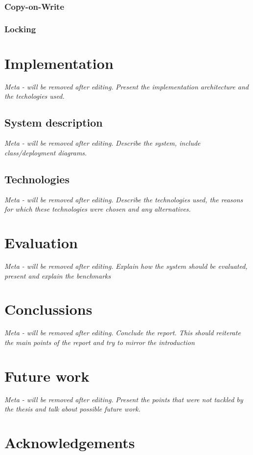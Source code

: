 \documentclass[11pt,a4paper]{globis-book}
\begin{document}
\subsection{Copy-on-Write}
\subsection{Locking}

\chapter{Implementation}
\textit{Meta - will be removed after editing.}
\textit{Present the implementation architecture and the techologies used.}
\section{System description}
\textit{Meta - will be removed after editing.}
\textit{Describe the system, include class/deployment diagrams.}
\section{Technologies}
\textit{Meta - will be removed after editing.}
\textit{Describe the technologies used, the reasons for which these technologies were chosen and any alternatives.}

\chapter{Evaluation}
\textit{Meta - will be removed after editing.}
\textit{Explain how the system should be evaluated, present and explain the benchmarks}
\chapter{Conclussions}

\textit{Meta - will be removed after editing.}
\textit{Conclude the report. This should reiterate the main points of the report and try to mirror the introduction}
\chapter{Future work}

\textit{Meta - will be removed after editing.}
\textit{Present the points that were not tackled by the thesis and talk about possible future work.}

\appendix

\listoffigures
\listoftables

\chapter*{Acknowledgements}

\newpage
\thispagestyle{empty}



\end{document}
